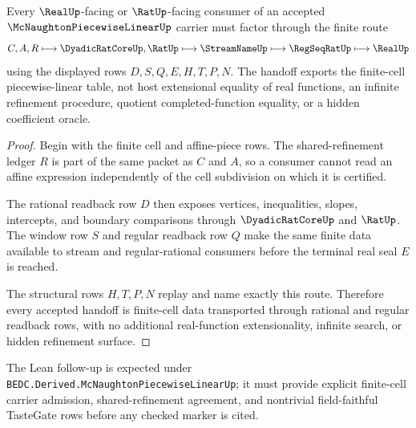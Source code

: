 \begin{theorem}
\label{thm:mcnaughton-piecewise-linear-finite-cell-handoff}
Every $\RealUp$-facing or $\RatUp$-facing consumer of an accepted $\McNaughtonPiecewiseLinearUp$ carrier must factor through the finite route
$$
C,A,R \longmapsto \DyadicRatCoreUp,\RatUp \longmapsto \StreamNameUp \longmapsto \RegSeqRatUp \longmapsto \RealUp
$$
using the displayed rows $D,S,Q,E,H,T,P,N$. The handoff exports the finite-cell piecewise-linear table, not host extensional equality of real functions, an infinite refinement procedure, quotient completed-function equality, or a hidden coefficient oracle.
\end{theorem}
\begin{proof}
Begin with the finite cell and affine-piece rows. The shared-refinement ledger $R$ is part of the same packet as $C$ and $A$, so a consumer cannot read an affine expression independently of the cell subdivision on which it is certified.

The rational readback row $D$ then exposes vertices, inequalities, slopes, intercepts, and boundary comparisons through $\DyadicRatCoreUp$ and $\RatUp$. The window row $S$ and regular readback row $Q$ make the same finite data available to stream and regular-rational consumers before the terminal real seal $E$ is reached.

The structural rows $H,T,P,N$ replay and name exactly this route. Therefore every accepted handoff is finite-cell data transported through rational and regular readback rows, with no additional real-function extensionality, infinite search, or hidden refinement surface.
\end{proof}


The Lean follow-up is expected under \texttt{BEDC.Derived.McNaughtonPiecewiseLinearUp}; it must provide explicit finite-cell carrier admission, shared-refinement agreement, and nontrivial field-faithful TasteGate rows before any checked marker is cited.

